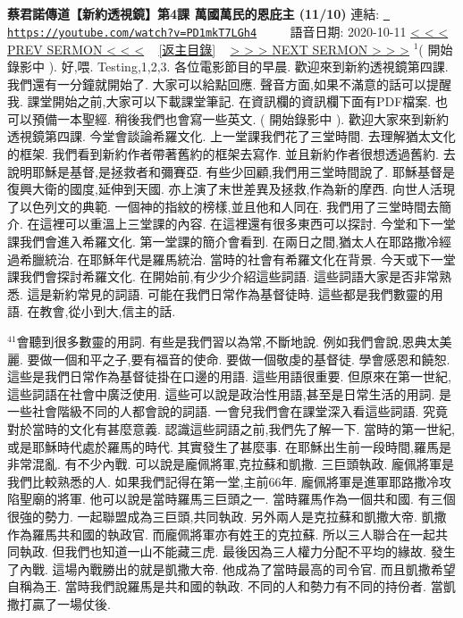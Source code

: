 \documentclass{book}
\begin{document}
\section{}
\label{sec:PD1mkT7LGh4}
\textbf{蔡君諾傳道【新約透視鏡】第4課  萬國萬民的恩庇主 (11/10)}
\newline
\newline
連結: \href{https://youtube.com/watch?v=PD1mkT7LGh4}{\texttt{ https://youtube.com/watch?v=PD1mkT7LGh4}} ~~~~ 語音日期: 2020-10-11 
\newline
\newline
\hyperref[sec:FpXj_b1Te98]{\small{< < < PREV SERMON < < <}}
~
\hyperref[sec:index]{\small{[返主目錄]}}
~
\hyperref[sec:MITfS88PZDg]{\small{> > > NEXT SERMON > > >}}
\newline
\newline
$^{1}$( 開始錄影中 ).
好,喂.
Testing,1,2,3.
各位電影節目的早晨.
歡迎來到新約透視鏡第四課.
我們還有一分鐘就開始了.
大家可以給點回應.
聲音方面,如果不滿意的話可以提醒我.
課堂開始之前,大家可以下載課堂筆記.
在資訊欄的資訊欄下面有PDF檔案.
也可以預備一本聖經.
稍後我們也會寫一些英文.
( 開始錄影中 ).
歡迎大家來到新約透視鏡第四課.
今堂會談論希羅文化.
上一堂課我們花了三堂時間.
去理解猶太文化的框架.
我們看到新約作者帶著舊約的框架去寫作.
並且新約作者很想透過舊約.
去說明耶穌是基督,是拯救者和彌賽亞.
有些少回顧,我們用三堂時間說了.
耶穌基督是復興大衛的國度,延伸到天國.
亦上演了末世差異及拯救,作為新的摩西.
向世人活現了以色列文的典範.
一個神的指紋的榜樣,並且他和人同在.
我們用了三堂時間去簡介.
在這裡可以重溫上三堂課的內容.
在這裡還有很多東西可以探討.
今堂和下一堂課我們會進入希羅文化.
第一堂課的簡介會看到.
在兩日之間,猶太人在耶路撒冷經過希臘統治.
在耶穌年代是羅馬統治.
當時的社會有希羅文化在背景.
今天或下一堂課我們會探討希羅文化.
在開始前,有少少介紹這些詞語.
這些詞語大家是否非常熟悉.
這是新約常見的詞語.
可能在我們日常作為基督徒時.
這些都是我們數靈的用語.
在教會,從小到大,信主的話.

$^{41}$會聽到很多數靈的用詞.
有些是我們習以為常,不斷地說.
例如我們會說,恩典太美麗.
要做一個和平之子,要有福音的使命.
要做一個敬虔的基督徒.
學會感恩和饒恕.
這些是我們日常作為基督徒掛在口邊的用語.
這些用語很重要.
但原來在第一世紀,這些詞語在社會中廣泛使用.
這些可以說是政治性用語,甚至是日常生活的用詞.
是一些社會階級不同的人都會說的詞語.
一會兒我們會在課堂深入看這些詞語.
究竟對於當時的文化有甚麼意義.
認識這些詞語之前,我們先了解一下.
當時的第一世紀,或是耶穌時代處於羅馬的時代.
其實發生了甚麼事.
在耶穌出生前一段時間,羅馬是非常混亂.
有不少內戰.
可以說是龐佩將軍,克拉蘇和凱撒.
三巨頭執政.
龐佩將軍是我們比較熟悉的人.
如果我們記得在第一堂,主前66年.
龐佩將軍是進軍耶路撒冷攻陷聖廟的將軍.
他可以說是當時羅馬三巨頭之一.
當時羅馬作為一個共和國.
有三個很強的勢力.
一起聯盟成為三巨頭,共同執政.
另外兩人是克拉蘇和凱撒大帝.
凱撒作為羅馬共和國的執政官.
而龐佩將軍亦有姓王的克拉蘇.
所以三人聯合在一起共同執政.
但我們也知道一山不能藏三虎.
最後因為三人權力分配不平均的緣故.
發生了內戰.
這場內戰勝出的就是凱撒大帝.
他成為了當時最高的司令官.
而且凱撒希望自稱為王.
當時我們說羅馬是共和國的執政.
不同的人和勢力有不同的持份者.
當凱撒打贏了一場仗後.
\end{document}
